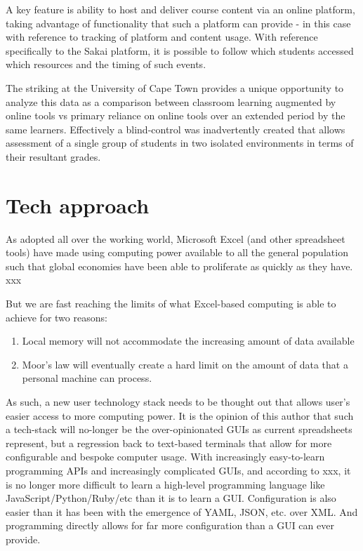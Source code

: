A key feature is ability to host and deliver course content via an online platform, taking advantage of functionality that such a platform can provide - in this case with reference to tracking of platform and content usage. With reference specifically to the Sakai platform, it is possible to follow which students accessed which resources and the timing of such events.

The striking at the University of Cape Town provides a unique opportunity to analyze this data as a comparison between classroom learning augmented by online tools vs primary reliance on online tools over an extended period by the same learners. Effectively a blind-control was inadvertently created that allows assessment of a single group of students in two isolated environments in terms of their resultant grades.

\section{Tech approach}
As adopted all over the working world, Microsoft Excel (and other spreadsheet tools) have made using computing power available to all the general population such that global economies have been able to proliferate as quickly as they have. xxx

But we are fast reaching the limits of what Excel-based computing is able to achieve for two reasons:

\begin{enumerate}
    \item Local memory will not accommodate the increasing amount of data available
    \item Moor's law will eventually create a hard limit on the amount of data that a personal machine can process.
\end{enumerate}

As such, a new user technology stack needs to be thought out that allows user's easier access to more computing power. It is the opinion of this author that such a tech-stack will no-longer be the over-opinionated GUIs as current spreadsheets represent, but a regression back to text-based terminals that allow for more configurable and bespoke computer usage. With increasingly easy-to-learn programming APIs and increasingly complicated GUIs, and according to xxx, it is no longer more difficult to learn a high-level programming language like JavaScript/Python/Ruby/etc than it is to learn a GUI. Configuration is also easier than it has been with the emergence of YAML, JSON, etc. over XML. And programming directly allows for far more configuration than a GUI can ever provide.

